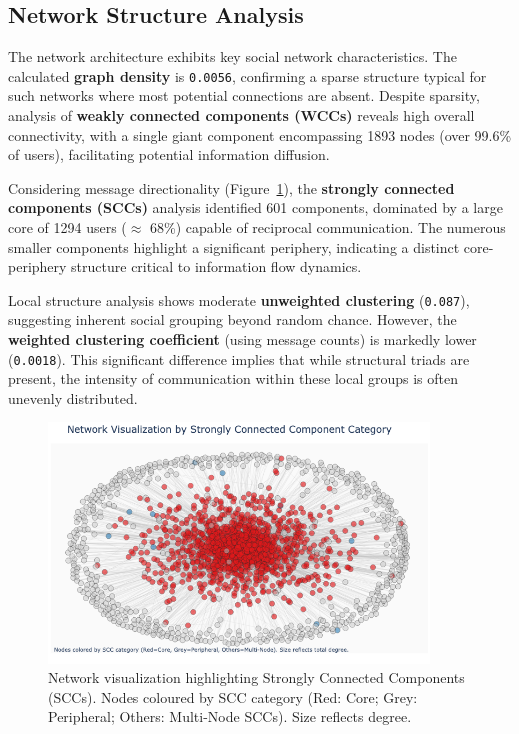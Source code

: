 \subsection{Network Structure Analysis}
\label{sec:network_structure}

The network architecture exhibits key social network characteristics. The calculated \textbf{graph density} is \texttt{0.0056}, confirming a sparse structure typical for such networks where most potential connections are absent. Despite sparsity, analysis of \textbf{weakly connected components (WCCs)} reveals high overall connectivity, with a single giant component encompassing 1893 nodes (over 99.6\% of users), facilitating potential information diffusion.

Considering message directionality (Figure~\ref{fig:scc_visualization}), the \textbf{strongly connected components (SCCs)} analysis identified 601 components, dominated by a large core of 1294 users ($\approx$ 68\%) capable of reciprocal communication. The numerous smaller components highlight a significant periphery, indicating a distinct core-periphery structure critical to information flow dynamics.

Local structure analysis shows moderate \textbf{unweighted clustering} (\texttt{0.087}), suggesting inherent social grouping beyond random chance. However, the \textbf{weighted clustering coefficient} (using message counts) is markedly lower (\texttt{0.0018}). This significant difference implies that while structural triads are present, the intensity of communication within these local groups is often unevenly distributed.


\begin{figure}[h!]
    \centering
    \includegraphics[width=0.9\textwidth]{../scc.png}
    \caption{Network visualization highlighting Strongly Connected Components (SCCs). Nodes coloured by SCC category (Red: Core; Grey: Peripheral; Others: Multi-Node SCCs). Size reflects degree.}
    \label{fig:scc_visualization}
\end{figure}

